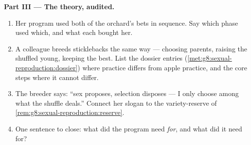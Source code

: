 \begin{problem}
\medskip\noindent\textbf{Part III --- The theory,
audited.}
\begin{enumerate}[resume]
  \item Her program used both of the orchard's bets in
        sequence. Say which phase used which, and what
        each bought her.
  \item A colleague breeds sticklebacks the same way
        --- choosing parents, raising the shuffled
        young, keeping the best. List the dossier
        entries (\cref{met:g8:sexual-reproduction:dossier})
        where  practice differs from apple
        practice, and the core steps where it cannot
        differ.
  \item The breeder says: ``sex proposes, selection
        disposes --- I only choose among what the
        shuffle deals.'' Connect her slogan to the
        variety-reserve of
        \cref{rem:g8:sexual-reproduction:reserve}.
  \item One sentence to close: what did the program
        need  \emph{for}, and what
        did it need  for?
\end{enumerate}
\end{problem}
